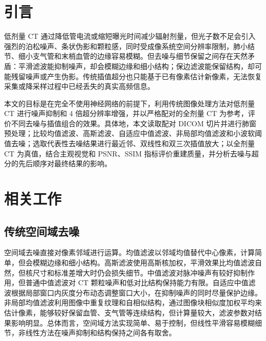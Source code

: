 \documentclass[10.5pt,compsoc,UTF8]{CjC}
\theoremstyle{mystyle}
\begin{document}
\vskip 10mm


\section{\heiti 引言}
\label{sec:introduction}

低剂量 CT 通过降低管电流或缩短曝光时间减少辐射剂量，但光子数不足会引入强烈的泊松噪声、条状伪影和颗粒感，同时受成像系统空间分辨率限制，肺小结节、细小支气管和末梢血管的边缘容易模糊。但去噪与细节保留之间存在天然矛盾：平滑滤波能抑制噪声，却会模糊边缘和细小结构；保边滤波能保留结构，却可能残留噪声或产生伪影。传统插值超分也只能基于已有像素估计新像素，无法恢复采集或降采样过程中已经丢失的真实高频信息。

本文的目标是在完全不使用神经网络的前提下，利用传统图像处理方法对低剂量 CT 进行噪声抑制和 4 倍超分辨率增强，并以严格配对的全剂量 CT 为参考，评价不同去噪与插值组合的效果。具体地，本文读取配对 DICOM 切片并进行肺窗预处理；比较均值滤波、高斯滤波、自适应中值滤波、非局部均值滤波和小波软阈值去噪；选取代表性去噪结果进行最近邻、双线性和双三次插值放大；以全剂量 CT 为真值，结合主观视觉和 PSNR、SSIM 指标评价重建质量，并分析去噪与超分的先后顺序对最终结果的影响。

\section{\heiti 相关工作}
\label{sec:related-work}

\subsection{传统空间域去噪}

空间域去噪直接对像素邻域进行运算。均值滤波以邻域均值替代中心像素，计算简单，但会模糊边缘和细小结构。高斯滤波使用高斯核加权，平滑效果比均值滤波自然，但核尺寸和标准差增大时仍会损失细节。中值滤波对脉冲噪声有较好抑制作用，但普通中值滤波对 CT 颗粒噪声和低对比结构保持能力有限。自适应中值滤波根据局部窗口内灰度分布动态调整窗口大小，在抑制噪声的同时尽量保护边缘。非局部均值滤波利用图像中重复纹理和自相似结构，通过图像块相似度加权平均来估计像素，能够较好保留血管、支气管等连续结构，但计算量较大，滤波参数对结果影响明显。总体而言，空间域方法实现简单、易于控制，但线性平滑容易模糊细节，非线性方法在噪声抑制和结构保持之间各有取舍。
\end{document}
